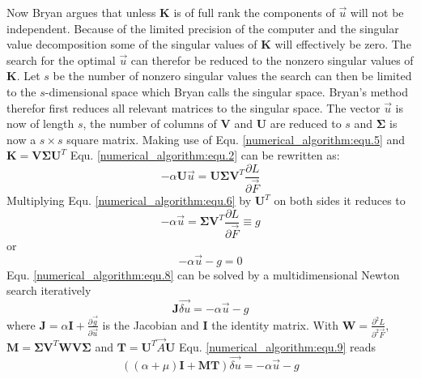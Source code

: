 \documentclass[10pt,letterpaper]{article}
\begin{document}
Now Bryan argues that unless $\mathbf{K}$ is of full rank the components of $\vec u$ will not be independent.
Because of the limited precision of the computer and the singular value decomposition some of the singular values of $\mathbf{K}$ will effectively be zero. The search for the optimal $\vec u$ can therefor be reduced to the nonzero singular values of $\mathbf{K}$. Let $s$ be the number of nonzero singular values the search can then be limited to the $s$-dimensional space which Bryan calls the singular space.
Bryan's method therefor first reduces all relevant matrices to the singular space. The vector $\vec u$ is now of length $s$, the number of columns of $\mathbf{V}$ and $\mathbf{U}$ are reduced to $s$ and $\mathbf{\Sigma}$ is now a $s \times s$ square matrix. Making use of Equ. \ref{numerical_algorithm:equ.5} and $\mathbf{K} = \mathbf{V} \mathbf{\Sigma} \mathbf{U}^T$ Equ. \ref{numerical_algorithm:equ.2} can be rewritten as:
\begin{equation}
	-\alpha \mathbf{U} \vec u = \mathbf{U} \mathbf{\Sigma} \mathbf{V}^T \frac{\partial L}{\partial \vec F}
	\label{numerical_algorithm:equ.6}
\end{equation}
Multiplying Equ. \ref{numerical_algorithm:equ.6} by $\mathbf{U}^T$ on both sides it reduces to
\begin{equation}
	-\alpha \vec u = \mathbf{\Sigma} \mathbf{V}^T \frac{\partial L}{\partial \vec F} \equiv g 
	\label{numerical_algorithm:equ.7}
\end{equation}
or
\begin{equation}
	-\alpha \vec u - g = 0
	\label{numerical_algorithm:equ.8}
\end{equation}
Equ. \ref{numerical_algorithm:equ.8} can be solved by a multidimensional Newton search iteratively
\begin{equation}
	\mathbf{J} \vec{\delta u} = -\alpha \vec u - g
	\label{numerical_algorithm:equ.9}
\end{equation}
where $\mathbf{J} = \alpha \mathbf{I} + \frac{\partial \vec g}{\partial \vec u}$ is the Jacobian and $\mathbf{I}$ the identity matrix. 
With $\mathbf{W} = \frac{\partial^2 L}{\partial^2 \vec F}$, $\mathbf{M} = \mathbf{\Sigma}\mathbf{V}^T\mathbf{W}\mathbf{V}\mathbf{\Sigma}$ and $\mathbf{T} = \mathbf{U}^T \vec A \mathbf{U}$ Equ. \ref{numerical_algorithm:equ.9} reads
\begin{equation}
	((\alpha + \mu) \mathbf{I} + \mathbf{M}\mathbf{T}) \vec{\delta u} = -\alpha \vec u - g
	\label{numerical_algorithm:equ.10}
\end{equation}
\end{document}
